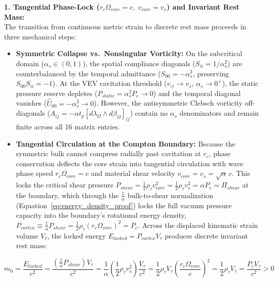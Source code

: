 \textbf{1. Tangential Phase-Lock ($r_c \Omega_{core} = c,\; v_{core} = v_s$) and Invariant Rest Mass:} \\ %
The transition from continuous metric strain to discrete rest mass proceeds in three mechanical steps:
\begin{itemize}
    \item \textbf{Symmetric Collapse vs.\ Nonsingular Vorticity:} On the subcritical domain ($\alpha_s \in (0, 1)$), the spatial compliance diagonals ($S_{ii} = 1/\alpha_s^2$) are counterbalanced by the temporal admittance ($S_{00} = -\alpha_s^2$, preserving $S_{00}S_{ii} = -1$). At the VEV cavitation threshold ($v_\circlearrowleft \to v_s$, $\alpha_s \to 0^+$), the static pressure reserve depletes ($P_{static} = \alpha_s^2 P_c \to 0$) and the temporal diagonal vanishes ($\hat{U}_{00} = -\alpha_s^2 \to 0$). However, the antisymmetric Clebsch vorticity off-diagonals ($A_{ij} = -\alpha t_p [d\lambda_\Omega \wedge d\beta_\Omega]_{ij}$) contain no $\alpha_s$ denominators and remain finite across all 16 matrix entries. %
    \item \textbf{Tangential Circulation at the Compton Boundary:} Because the symmetric bulk cannot compress radially past cavitation at $r_c$, phase conservation deflects the core strain into tangential circulation with wave phase speed $r_c \Omega_{core} = c$ and material shear velocity $v_{core} = v_s = \sqrt{\alpha}\,c$. This locks the critical shear pressure $P_{shear} = \frac{1}{2}\rho_\tau v_{core}^2 = \frac{1}{2}\rho_\tau v_s^2 = \alpha P_c = \Pi_{shear}$ at the boundary, which through the $\frac{1}{\alpha}$ bulk-to-shear normalization (Equation~\ref{eq:energy_density_proof}) locks the full vacuum pressure capacity into the boundary's rotational energy density, $P_{vortex} \equiv \frac{1}{\alpha}P_{shear} = \frac{1}{2}\rho_\tau (r_c \Omega_{core})^2 = P_c$. Across the displaced kinematic strain volume $V_\tau$, the locked energy $E_{locked} = P_{vortex} V_\tau$ produces discrete invariant rest mass: %
\end{itemize}
\begin{equation}
    m_0 = \frac{E_{locked}}{c^2} = \frac{\left(\frac{1}{\alpha}P_{shear}\right) V_\tau}{c^2} = \frac{1}{\alpha}\left(\frac{1}{2}\rho_\tau v_s^2\right)\frac{V_\tau}{c^2} = \frac{1}{2}\rho_\tau V_\tau \left(\frac{r_c \Omega_{core}}{c}\right)^2 = \frac{1}{2}\rho_\tau V_\tau = \frac{P_c V_\tau}{c^2} > 0 \label{eq:cavitation_phase_lock} %
\end{equation}
